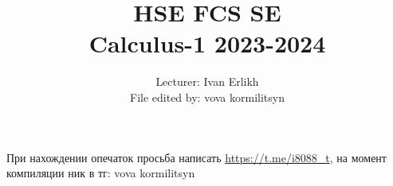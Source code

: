 \documentclass{report}
\title{\textbf{HSE FCS SE}\\\textbf{Calculus-1 2023-2024}}
\author{Lecturer: Ivan Erlikh\\File edited by: vova kormilitsyn}
\date{
    \begin{flushright}
        ver. 1.3.2
    \end{flushright}
}
\begin{document}
\maketitle

\tableofcontents













При нахождении опечаток просьба написать \url{https://t.me/i8088_t}, на момент компиляции ник в тг: vova kormilitsyn
\end{document}
